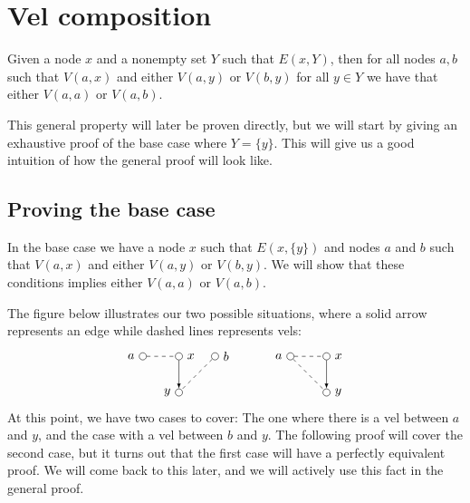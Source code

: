 \section{Vel composition}
\label{sec:Vel composition}
\begin{theorem}
  Given a node $x$ and a nonempty set $Y$ such that $E(x,Y)$, then for all nodes $a,b$ such that $V(a,x)$ and either $V(a,y)$ or $V(b,y)$ for all $y \in Y$ we have that either $V(a,a)$ or $V(a,b)$.
\end{theorem}
This general property will later be proven directly, but we will start by giving an exhaustive proof of the base case where $Y=\{ y \}$.
This will give us a good intuition of how the general proof will look like.
\subsection{Proving the base case}
\label{sub:Proving the base case}
In the base case we have a node $x$ such that $E(x,\{ y \})$ and nodes $a$ and $b$ such that $V(a,x)$ and either $V(a,y)$ or $V(b,y)$.
We will show that these conditions implies either $V(a,a)$ or $V(a,b)$.

The figure below illustrates our two possible situations, where a solid arrow represents an edge while dashed lines represents vels:
\[
\begin{tikzpicture}
  [point/.style={circle,draw,inner sep=0pt,minimum size=2mm}]
  \node (a) at (0,1) [point,label=left:$a$] {};
  \node (b) at (2,1) [point,label=right:$b$] {};

  \node (x) at (1,1) [point,label=right:$x$] {};
  \node (y) at (1,0) [point,label=left:$y$] {};

  \draw [-latex] (x) to (y);
  \draw [dashed] (a) to (x);
  \draw [dashed] (b) to (y);
\end{tikzpicture}
\quad\quad\quad
\begin{tikzpicture}
  [point/.style={circle,draw,inner sep=0pt,minimum size=2mm}]
  \node (a) at (0,1) [point,label=left:$a$] {};

  \node (x) at (1,1) [point,label=right:$x$] {};
  \node (y) at (1,0) [point,label=right:$y$] {};

  \draw [-latex] (x) to (y);
  \draw [dashed] (a) to (x);
  \draw [dashed] (a) to (y);
\end{tikzpicture}
\]
At this point, we have two cases to cover:
The one where there is a vel between $a$ and $y$, and the case with a vel between $b$ and $y$.
The following proof will cover the second case, but it turns out that the first case will have a perfectly equivalent proof.
We will come back to this later, and we will actively use this fact in the general proof.


